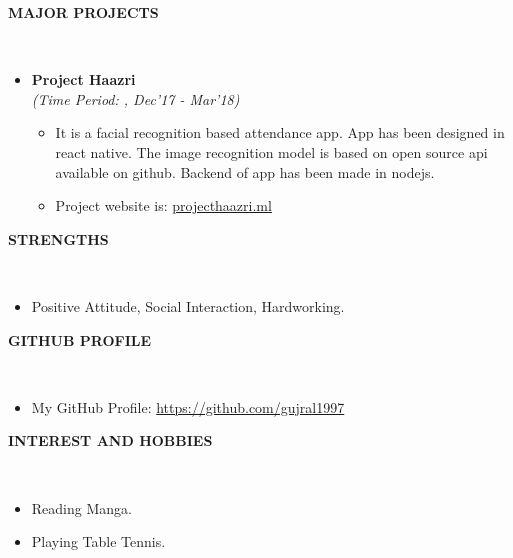 \documentclass[a4paper,10pt]{article}
\newcommand{\isep}{-2 pt}
\newcommand{\lsep}{-0.5cm}
\newcommand{\resheading}[1]{{\small \colorbox{mygrey}{\begin{minipage}{0.975\textwidth}{\textbf{#1 \vphantom{p\^{E}}}}\end{minipage}}}}
\begin{document}
\resheading{\textbf{MAJOR PROJECTS} }\\[\lsep]
\begin{itemize}
\item \textbf{Project Haazri
} \\
 \emph{(Time Period:
, Dec'17 - Mar'18)} \\[-0.6cm]
	\begin{itemize}\itemsep \isep
	\item  It is a facial recognition based attendance app. App has been designed in react native. The image recognition model is based on open source api available on github. Backend of app has been made in nodejs. 
	\item Project website is: \url {projecthaazri.ml}

	\end{itemize}
\end{itemize}

\resheading{\textbf{STRENGTHS} }\\[\lsep]
\begin{itemize}
\item \noindent Positive Attitude, Social Interaction, Hardworking.
\end{itemize}

\resheading{\textbf{GITHUB PROFILE} }\\[\lsep]
\begin{itemize}
\item My GitHub Profile: \url{https://github.com/gujral1997}

\end{itemize}

\resheading{\textbf{INTEREST AND HOBBIES} }\\[\lsep]
\begin{itemize}
\item \noindent Reading Manga.
\item \noindent Playing Table Tennis.

\end{itemize}
\end{document}
